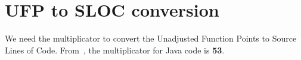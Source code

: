 \section{UFP to SLOC conversion}
We need the multiplicator to convert the Unadjusted Function Points to Source Lines of Code.
From~\cite{cocomo-manual}, the multiplicator for Java code is \textbf{53}.
